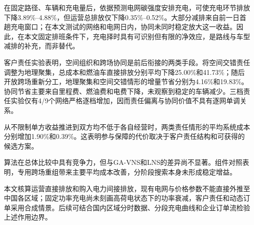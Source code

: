 \documentclass{setp-new}
\newif\ifESevenReady
\begin{document}
在固定路径、车辆和充电量后，依据预测电网碳强度安排充电，可使充电环节排放下降3.89\%--4.88\%，但运营总排放仅下降0.35\%--0.52\%。大部分减排来自前一日首趟充电窗口；在本文测试的网络和电网日内，协同未同时稳定放大这一收益。因此，在本文固定排班条件下，充电择时具有可识别但有限的净效应，是路线与车型减排的补充，而非替代。

客户责任实验表明，空间组织和跨场协同是前后衔接的两类手段。将空间交错责任调整为地理聚集，总成本和燃油车直接排放分别平均下降25.00\%和41.73\%；随后开放跨场重新分工，地理聚集和空间交错情形的增量节省分别为4.16\%和19.83\%。协同节省主要来自里程费、燃油费和电费下降，未观察到稳定的车辆减少。三档责任实验仅有4/9个网络严格逐档增加，因而责任偏离与协同价值不具有逐网单调关系。

从不限制单方收益推进到双方均不低于各自经营时，两类责任情形的平均系统成本分别增加1.90\%和0.39\%。这表明参与保障的代价取决于客户责任结构和可获得的候选方案。

算法在总体比较中具有竞争力，但与GA-VNS和LNS的差异尚不显著。组件对照表明，专用跨场重组带来主要平均成本改善，分阶段搜索本身未形成稳定增益。

\ifESevenReady\fi

本文核算运营直接排放和购入电力间接排放，现有电网与价格参数不能直接外推至中国各区域；固定功率充电尚未刻画高荷电状态下的功率衰减，客户责任和动态订单采用合成情景。后续可结合国内区域分时数据、分段充电曲线和企业订单流检验上述作用边界。
\end{document}
